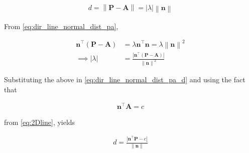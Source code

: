 \documentclass[12pt]{article}
\providecommand{\brak}[1]{\ensuremath{\left(#1\right)}}
\providecommand{\norm}[1]{\left\lVert#1\right\rVert}
\providecommand{\abs}[1]{\left\vert#1\right\vert}
\let\vec\mathbf
\begin{document}
\begin{enumerate}
\begin{enumerate}
\begin{align}
	\label{eq:dir_line_normal_dist_pa_d}
d = 	\norm{\vec{P}- \vec{A}}= \abs{\lambda} \norm{\vec{n}}
\end{align}

From 
	\eqref{eq:dir_line_normal_dist_pa},

\begin{align}
	\vec{n}^{\top}
	\brak{\vec{P}- \vec{A}} &=  \lambda \vec{n}^{\top}\vec{n} = \lambda\norm{\vec{n}}^2
	\\
	\implies \abs{\lambda}&= \frac{\abs{\vec{n}^{\top}
	\brak{\vec{P}- \vec{A}}}}{\norm{\vec{n}}^2} 
\end{align}

Substituting the above in \eqref{eq:dir_line_normal_dist_pa_d} and using the fact that

\begin{align}
   \vec{n}^{\top}\vec{A} = c
\end{align}

from 	\eqref{eq:2Dline}, yields 

\begin{align}
	\label{eq:line_dist_2d}
	d = \frac{\abs{   \vec{n}^{\top}\vec{P}-c }}{\norm{\vec{n}}}	
\end{align}


\end{enumerate}
\end{enumerate}
\end{document}
